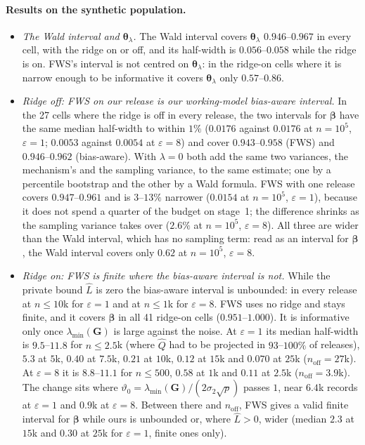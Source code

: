 \documentclass[11pt]{article}
\theoremstyle{definition}
\theoremstyle{plain}
\newcommand{\bbeta}{\boldsymbol{\beta}}
\newcommand{\btheta}{\boldsymbol{\theta}}
\newcommand{\bG}{\mathbf{G}}
\begin{document}
\paragraph{Results on the synthetic population.}
\begin{itemize}
  \item \emph{The Wald interval and $\btheta_\lambda$.} The Wald interval covers $\btheta_\lambda$ $0.946$--$0.967$ in every cell, with the ridge on or off, and its half-width is $0.056$--$0.058$ while the ridge is on. FWS's interval is not centred on $\btheta_\lambda$: in the ridge-on cells where it is narrow enough to be informative it covers $\btheta_\lambda$ only $0.57$--$0.86$.
  \item \emph{Ridge off: FWS on our release is our working-model bias-aware interval.} In the 27 cells where the ridge is off in every release, the two intervals for $\bbeta$ have the same median half-width to within $1\%$ ($0.0176$ against $0.0176$ at $n = 10^5$, $\varepsilon = 1$; $0.0053$ against $0.0054$ at $\varepsilon = 8$) and cover $0.943$--$0.958$ (FWS) and $0.946$--$0.962$ (bias-aware). With $\lambda = 0$ both add the same two variances, the mechanism's and the sampling variance, to the same estimate; one by a percentile bootstrap and the other by a Wald formula. FWS with one release covers $0.947$--$0.961$ and is $3$--$13\%$ narrower ($0.0154$ at $n = 10^5$, $\varepsilon = 1$), because it does not spend a quarter of the budget on stage~1; the difference shrinks as the sampling variance takes over ($2.6\%$ at $n = 10^5$, $\varepsilon = 8$). All three are wider than the Wald interval, which has no sampling term: read as an interval for $\bbeta$, the Wald interval covers only $0.62$ at $n = 10^5$, $\varepsilon = 8$.
  \item \emph{Ridge on: FWS is finite where the bias-aware interval is not.} While the private bound $\hat L$ is zero the bias-aware interval is unbounded: in every release at $n \le 10$k for $\varepsilon = 1$ and at $n \le 1$k for $\varepsilon = 8$. FWS uses no ridge and stays finite, and it covers $\bbeta$ in all 41 ridge-on cells ($0.951$--$1.000$). It is informative only once $\lambda_{\min}(\bG)$ is large against the noise. At $\varepsilon = 1$ its median half-width is $9.5$--$11.8$ for $n \le 2.5$k (where $\hat Q$ had to be projected in $93$--$100\%$ of releases), $5.3$ at $5$k, $0.40$ at $7.5$k, $0.21$ at $10$k, $0.12$ at $15$k and $0.070$ at $25$k ($n_{\mathrm{off}} = 27$k). At $\varepsilon = 8$ it is $8.8$--$11.1$ for $n \le 500$, $0.58$ at $1$k and $0.11$ at $2.5$k ($n_{\mathrm{off}} = 3.9$k). The change sits where $\vartheta_0 = \lambda_{\min}(\bG)/(2\sigma_2\sqrt p)$ passes $1$, near $6.4$k records at $\varepsilon = 1$ and $0.9$k at $\varepsilon = 8$. Between there and $n_{\mathrm{off}}$, FWS gives a valid finite interval for $\bbeta$ while ours is unbounded or, where $\hat L > 0$, wider (median $2.3$ at $15$k and $0.30$ at $25$k for $\varepsilon = 1$, finite ones only).

\end{itemize}
\end{document}
